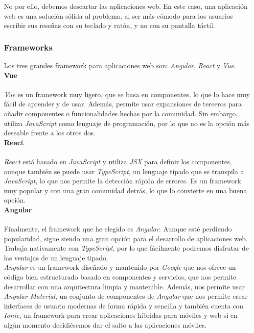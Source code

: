 No por ello, debemos descartar las aplicaciones web. En este caso, una aplicación web es una solución sólida al
problema, al ser más cómodo para los usuarios escribir sus reseñas con su teclado y ratón, y no con su pantalla
táctil.\\

\subsubsection{Frameworks}
Los tres grandes framework para aplicaciones web son: \textit{Angular}\cite{angular}, \textit{React}\cite{react} y
\textit{Vue}\cite{vue}.\\

\noindent \textbf{Vue}\\ \\
\indent \textit{Vue} es un framework muy ligero, que se basa en componentes, lo que lo hace muy fácil de aprender y de usar.
Además, permite usar expansiones de terceros para añadir componentes o funcionalidades hechas por la comunidad. Sin
embargo, utiliza \textit{JavaScript}\cite{javascript} como lenguaje de programación, por lo que no es la opción más
deseable frente a los otros dos.\\

\noindent \textbf{React}\\ \\
\indent \textit{React} está basado en \textit{JavaScript} y utiliza \textit{JSX}\cite{jsx} para definir los componentes, aunque
también se puede usar \textit{TypeScript}\cite{typescript}, un lenguaje tipado que se transpila a \textit{JavaScript},
lo que nos permite la detección rápida de errores. Es un framework muy popular y con una gran comunidad detrás, lo que
lo convierte en una buena opción.\\

\noindent \textbf{Angular}\\ \\
\indent Finalmente, el framework que he elegido es \textit{Angular}. Aunque esté perdiendo popularidad, sigue
siendo una gran opción para el desarrollo de aplicaciones web. Trabaja nativamente con \textit{TypeScript}, por lo que
fácilmente podremos disfrutar de las ventajas de un lenguaje tipado.\\

\textit{Angular} es un framework diseñado y mantenido por \textit{Google} que nos ofrece un código bien estructurado
basado en componentes y servicios, que nos permite desarrollar con una arquitectura limpia y mantenible. Además, nos
permite usar \textit{Angular Material}\cite{angularmaterial}, un conjunto de componentes de \textit{Angular} que nos
permite crear interfaces de usuario modernas de forma rápida y sencilla y también cuenta con \textit{Ionic}\cite{ionic},
un framework para crear aplicaciones híbridas para móviles y web si en algún momento decidiésemos dar el salto a las
aplicaciones móviles.\\



